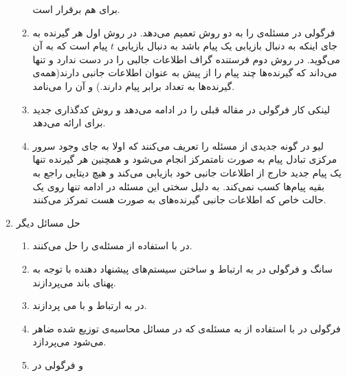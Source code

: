 \begin{enumerate}
\begin{enumerate}
 		\icod
 		برای
 		\picod
 		هم برقرار است.
 		\item 
 		فرگولی در
 		\cite{6620405}
 		مسئله‌ی
 		\picod
 		را به دو روش تعمیم می‌دهد. در روش اول هر گیرنده به جای اینکه به دنبال بازیابی یک پیام باشد به دنبال بازیابی
 		$t$
 		پیام است که به آن
 		می‌گوید.
 		در روش دوم فرستنده گراف اطلاعات جالبی را در دست ندارد و تنها می‌داند که گیرنده‌ها چند پیام را از پیش به عنوان اطلاعات جانبی دارند(همه‌ی گیرنده‌ها به تعداد برابر پیام دارند.) و آن را
 		می‌نامد.
 		\item 
 		لینکی کار فرگولی در مقاله قبلی را در
 		\cite{8625330}
 		ادامه می‌دهد و روش کدگذاری جدید برای 
 		ارائه می‌دهد.
 		\item 
 		لیو در
 		\cite{9173957}
 		گونه جدیدی از مسئله را تعریف می‌کنند که اولا به جای وجود سرور مرکزی تبادل پیام به صورت نامتمرکز انجام می‌شود  و همچنین هر گیرنده تنها یک پیام جدید خارج از اطلاعات جانبی خود بازیابی می‌کند و هیچ دیتایی راجع به بقیه پیام‌ها کسب نمی‌کند. به دلیل سختی این مسئله در ادامه تنها روی یک حالت خاص که اطلاعات جانبی گیرنده‌های به صورت
 		هست تمرکز می‌کنند.	
 		
 	\end{enumerate}
 	\item حل مسائل دیگر
 	\begin{enumerate}
 		\item 
 		در
 		\cite{Obead_2023}
 		با استفاده از  
 		\picod
 		مسئله‌ی
 		را حل می‌کنند.
 		\item
 		سانگ و فرگولی در
 		\cite{8404065}
 		به ارتباط 
 		\picod
 		و ساختن  سیستم‌های پیشنهاد دهنده‌ با توجه به پهنای باند می‌پردازند.
 		\item
 		در
 		\cite{e24081149}
 		به ارتباط 
 		\icod
 		و
 		\picod
 		با
 		می پردازند.
 		\item 
 		فرگولی در
 		\cite{datashuf}
 		با استفاده از
 		\picod
 		به مسئله‌ی
 		که در مسائل محاسبه‌ی توزیع شده ضاهر می‌شود می‌پردازد.
 		\item
 		و فرگولی در
 		

\end{enumerate}
\end{enumerate}
